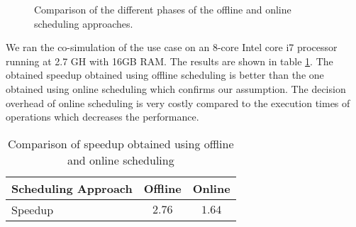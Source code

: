 \begin{figure}[phbt]
\centering

\caption{Comparison of the different phases of the offline and online scheduling approaches.}
\label{fig:tbbvsrcosim}
\end{figure}

We ran the co-simulation of the use case on an 8-core Intel core i7 processor running at 2.7 GH with 16GB RAM. The results are shown in table \ref{table:spdup_compr}. The obtained speedup obtained using offline scheduling is better than the one obtained using online scheduling which confirms our assumption. The decision overhead of online scheduling is very costly compared to the execution times of operations which decreases the performance. 

\begin{table}[phbt]
\caption{Comparison of speedup obtained using offline and online scheduling}
\centering
\label{table:spdup_compr}
\begin{tabular}{l c c}
\toprule
\parbox[l]{5cm}{\raggedright Scheduling Approach} & Offline & Online \\
\midrule
Speedup & $2.76$ & $1.64$\\
\bottomrule
\end{tabular}
\end{table}


